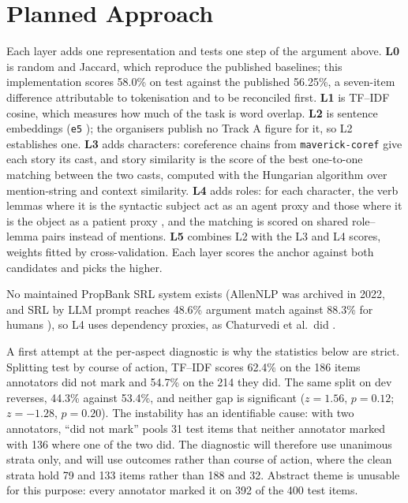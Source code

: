 \documentclass[11pt,letterpaper]{article}
\begin{document}
\section{Planned Approach}\label{sec:approach}

Each layer adds one representation and tests one step of the argument above. \textbf{L0} is random and
Jaccard, which reproduce the published baselines; this implementation scores 58.0\% on test against the published
56.25\%, a seven-item difference attributable to tokenisation and to be reconciled first.
\textbf{L1} is TF--IDF cosine, which measures how much of the task is word overlap. \textbf{L2} is sentence
embeddings (\texttt{e5} \cite{e5}); the organisers publish no Track A figure for it, so L2 establishes one.
\textbf{L3} adds characters: coreference chains from \texttt{maverick-coref} \cite{maverick,jm3} give each story
its cast, and story similarity is the score of the best one-to-one matching between the two casts, computed with
the Hungarian algorithm over mention-string and context similarity. \textbf{L4} adds roles: for each character, the verb
lemmas where it is the syntactic subject act as an agent proxy and those where it is the object as a patient
proxy \cite[Chapter~22]{jm3}, and the matching is scored on shared role--lemma pairs instead of mentions. \textbf{L5}
combines L2 with the L3 and L4 scores, weights fitted by cross-validation. Each layer scores the anchor against
both candidates and picks the higher.

No maintained PropBank SRL system exists (AllenNLP was archived in 2022, and SRL by LLM prompt reaches 48.6\%
argument match against 88.3\% for humans \cite{bonn2024}), so L4 uses dependency proxies, as Chaturvedi et al.\
did \cite{chaturvedi2018}.

A first attempt at the per-aspect diagnostic is why the statistics below are strict. Splitting test by
course of action, TF--IDF scores 62.4\% on the 186 items annotators did not mark and 54.7\% on the 214 they did.
The same split on dev reverses, 44.3\% against 53.4\%, and neither gap is significant ($z=1.56$, $p=0.12$;
$z=-1.28$, $p=0.20$). The instability has an identifiable cause: with two annotators, ``did not mark'' pools 31
test items that neither annotator marked with 136 where one of the two did. The diagnostic will therefore use
unanimous strata only, and will use outcomes rather than course of action, where the clean strata hold 79 and 133
items rather than 188 and 32. Abstract theme is unusable for this purpose: every annotator marked it on 392 of
the 400 test items.
\end{document}
